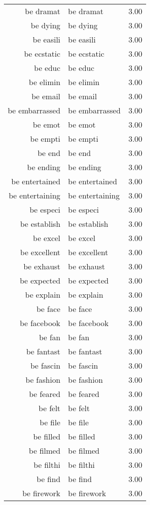 \begin{table}[ht]
\begin{tabular}{rlr}
  be dramat & be dramat & 3.00 \\ 
  be dying & be dying & 3.00 \\ 
  be easili & be easili & 3.00 \\ 
  be ecstatic & be ecstatic & 3.00 \\ 
  be educ & be educ & 3.00 \\ 
  be elimin & be elimin & 3.00 \\ 
  be email & be email & 3.00 \\ 
  be embarrassed & be embarrassed & 3.00 \\ 
  be emot & be emot & 3.00 \\ 
  be empti & be empti & 3.00 \\ 
  be end & be end & 3.00 \\ 
  be ending & be ending & 3.00 \\ 
  be entertained & be entertained & 3.00 \\ 
  be entertaining & be entertaining & 3.00 \\ 
  be especi & be especi & 3.00 \\ 
  be establish & be establish & 3.00 \\ 
  be excel & be excel & 3.00 \\ 
  be excellent & be excellent & 3.00 \\ 
  be exhaust & be exhaust & 3.00 \\ 
  be expected & be expected & 3.00 \\ 
  be explain & be explain & 3.00 \\ 
  be face & be face & 3.00 \\ 
  be facebook & be facebook & 3.00 \\ 
  be fan & be fan & 3.00 \\ 
  be fantast & be fantast & 3.00 \\ 
  be fascin & be fascin & 3.00 \\ 
  be fashion & be fashion & 3.00 \\ 
  be feared & be feared & 3.00 \\ 
  be felt & be felt & 3.00 \\ 
  be file & be file & 3.00 \\ 
  be filled & be filled & 3.00 \\ 
  be filmed & be filmed & 3.00 \\ 
  be filthi & be filthi & 3.00 \\ 
  be find & be find & 3.00 \\ 
  be firework & be firework & 3.00 \\ 

\end{tabular}
\end{table}
